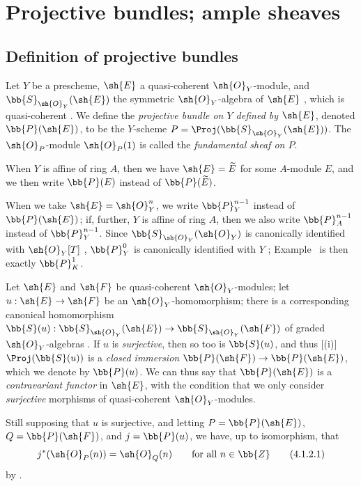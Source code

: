 \section{Projective bundles; ample sheaves}
\label{section:II.4}


\subsection{Definition of projective bundles}
\label{subsection:II.4.1}

\begin{definition}[4.1.1]
\label{II.4.1.1}
Let $Y$ be a prescheme, $\sh{E}$ a quasi-coherent $\sh{O}_Y$-module, and $\bb{S}_{\sh{O}_Y}(\sh{E})$ the symmetric $\sh{O}_Y$-algebra of $\sh{E}$ , which is quasi-coherent .
We define the \emph{projective bundle on $Y$ defined by $\sh{E}$}, denoted $\bb{P}(\sh{E})$, to be the $Y$-scheme $P=\Proj(\bb{S}_{\sh{O}_Y}(\sh{E}))$.
The $\sh{O}_P$-module $\sh{O}_P(1)$ is called the \emph{fundamental sheaf on $P$}.
\end{definition}

When $Y$ is affine of ring $A$, then we have $\sh{E}=\widetilde{E}$ for some $A$-module $E$, and we then write $\bb{P}(E)$ instead of $\bb{P}(\widetilde{E})$.

When we take $\sh{E}=\sh{O}_Y^n$, we write $\bb{P}_Y^{n-1}$ instead of $\bb{P}(\sh{E})$;
if, further, $Y$ is affine of ring $A$, then we also write $\bb{P}_A^{n-1}$ instead of $\bb{P}_Y^{n-1}$.
Since $\bb{S}_{\sh{O}_Y}(\sh{O}_Y)$ is canonically identified with $\sh{O}_Y[T]$ , $\bb{P}_Y^0$ is canonically identified with $Y$ ;
Example~ is then exactly $\bb{P}_K^1$.

\begin{env}[4.1.2]
\label{II.4.1.2}
Let $\sh{E}$ and $\sh{F}$ be quasi-coherent $\sh{O}_Y$-modules;
let $u:\sh{E}\to\sh{F}$ be an $\sh{O}_Y$-homomorphism;
there is a corresponding canonical homomorphism $\bb{S}(u):\bb{S}_{\sh{O}_Y}(\sh{E})\to\bb{S}_{\sh{O}_Y}(\sh{F})$ of graded $\sh{O}_Y$-algebras .
If $u$ is \emph{surjective}, then so too is $\bb{S}(u)$, and thus [(i)] $\Proj(\bb{S}(u))$ is a \emph{closed immersion} $\bb{P}(\sh{F})\to\bb{P}(\sh{E})$, which we denote by $\bb{P}(u)$.
We can thus say that $\bb{P}(\sh{E})$ is a \emph{contravariant functor} in $\sh{E}$, with the condition that we only consider \emph{surjective} morphisms of quasi-coherent $\sh{O}_Y$-modules.

Still supposing that $u$ is surjective, and letting $P=\bb{P}(\sh{E})$, $Q=\bb{P}(\sh{F})$, and $j=\bb{P}(u)$, we have, up to isomorphism, that
\[
\label{II.4.1.2.1}
  j^*(\sh{O}_P(n)) = \sh{O}_Q(n)
  \qquad\mbox{for all $n\in\bb{Z}$}
  \tag{4.1.2.1}
\]
by .
\end{env}


